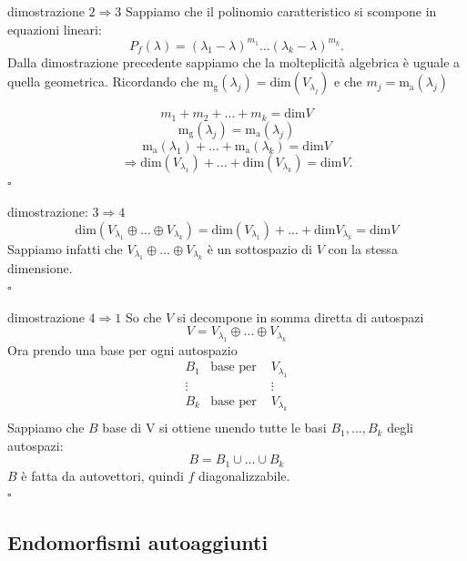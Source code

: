 \documentclass[x11names]{article}
\newcommand*{\QEDB}{\null\nobreak\hfill\ensuremath{\square}}%
\begin{document}
\begin{es}{dimostrazione $2 \Rightarrow 3$}
Sappiamo che il polinomio caratteristico si scompone in equazioni lineari:
\[
P_{f}\left(\lambda\right) = \left(\lambda_1 - \lambda\right)^{m_1}\dots\left(\lambda_{k} - \lambda\right)^{m_{k}}
.\] 
Dalla dimostrazione precedente sappiamo che la molteplicità algebrica è uguale a quella geometrica. Ricordando che $\text{m}_{\text{g}}\left(\lambda_{j}\right)=\text{dim}\left(V_{\lambda_{j}}\right)$ e che $m_j = \text{m}_{\text{a}}\left(\lambda_{j}\right)$

\[
m_1 + m_2 + \dots + m_{k} = \text{dim}V
\] 
\[
\text{m}_{\text{g}}\left(\lambda_{j}\right) = \text{m}_{\text{a}}\left(\lambda_{j}\right)
\] 
\[
 \text{m}_{\text{a}}\left(\lambda_{1}\right) + \dots +  \text{m}_{\text{a}}\left(\lambda_{k}\right) = \text{dim}V
\]
\[
\Longrightarrow \text{dim}\left(V_{\lambda_{1}}\right) + \dots + \text{dim}\left(V_{\lambda_{k}}\right) = \text{dim}V
.\]  \QEDB
\end{es}

\begin{es}{dimostrazione: $3 \Rightarrow 4$}
\[
\text{dim}\left(V_{\lambda_{1}} \oplus \dots \oplus V_{\lambda_{k}}\right) = \text{dim}\left(V_{\lambda_{1}}\right) + \dots + \text{dim}V_{\lambda_{k}} = \text{dim}V
\] 
Sappiamo infatti che $V_{\lambda_{1}} \oplus \dots \oplus V_{\lambda_{k}}$ è un sottospazio di $V$ con la stessa dimensione.
\\
\QEDB
\end{es}

\begin{es}{dimostrazione $4 \Rightarrow 1$}
So che $V$ si decompone in somma diretta di autospazi
\[
V = V_{\lambda_{1}} \oplus \dots \oplus V_{\lambda_{k}}
\] 
Ora prendo una base per ogni autospazio
\[
\begin{array}{ccc}
	B_1 & \text{base per } & V_{\lambda_{1}} \\
	\vdots & & \vdots \\
	B_k & \text{base per } & V_{\lambda_{k}} \\
\end{array}
\] 
Sappiamo che $B$ base di V si ottiene unendo tutte le basi $B_1, \dots, B_{k}$ degli autospazi:
\[
B = B_1 \cup \dots \cup B_{k}
\]
$B$ è fatta da autovettori, quindi $f$ diagonalizzabile.
\\
\QEDB
\end{es}



\subsection{Endomorfismi autoaggiunti}
\end{document}
